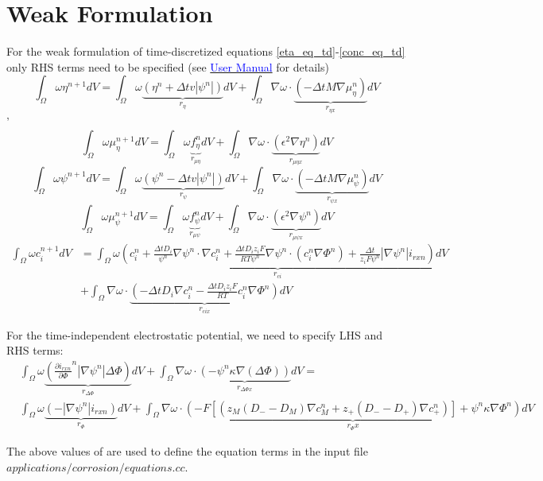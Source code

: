 \documentclass[10pt]{article}
\begin{document}
\section{Weak Formulation}
For the weak formulation of time-discretized equations \eqref{eta_eq_td}-\eqref{conc_eq_td} only RHS terms need to be specified (see \href{https://prisms-center.github.io/phaseField/doxygen_files/app_files.html}{\textcolor{blue}{User Manual}} for details)
\begin{equation}
\int_{\Omega} \omega \eta^{n+1} dV = \int_{\Omega} \omega \underbrace{\left( \eta^n +\Delta t v  |\psi^n|\right)}_{r_\eta}dV + \int_{\Omega} \nabla \omega \cdot  \underbrace{\left(-  \Delta t M \nabla \mu_\eta^n \right)}_{r_{\eta x}}dV
\end{equation}'
\begin{equation}
\int_{\Omega} \omega \mu_\eta^{n+1} dV = \int_{\Omega} \omega \underbrace{f_\eta^n}_{r_{\mu \eta}}dV + \int_{\Omega} \nabla \omega \cdot  \underbrace{(\epsilon^2\nabla\eta^n)}_{r_{\mu \eta x}}dV
\end{equation}
\begin{equation}
\int_{\Omega} \omega \psi^{n+1} dV = \int_{\Omega} \omega \underbrace{\left( \psi^n -\Delta t v  |\psi^n|\right)}_{r_\psi} dV+ \int_{\Omega} \nabla \omega \cdot  \underbrace{\left(-  \Delta t M \nabla \mu_\psi^n \right)}_{r_{\psi x}}dV
\end{equation}
\begin{equation}
\int_{\Omega} \omega \mu_\psi^{n+1} dV = \int_{\Omega} \omega \underbrace{f_\psi^n}_{r_{\mu \psi}}dV + \int_{\Omega} \nabla \omega \cdot  \underbrace{(\epsilon^2\nabla\psi^n)}_{r_{\mu \psi x}}dV
\end{equation}
\begin{align}
\int_{\Omega} \omega c_i^{n+1} dV &=\int_{\Omega} \omega \underbrace{\left( c_i^n+\frac{\Delta t D_i}{\psi^n}\nabla\psi^n\cdot\nabla c_i^n 
+\frac{\Delta t D_i z_i F}{RT\psi^n}\nabla\psi^n\cdot(c_i^n\nabla \Phi^n) +\frac{\Delta t}{z_i F\psi^n} |\nabla\psi^n| i_{rxn}\right)}_{r_{ci}} dV\\ 
&+ \int_{\Omega} \nabla \omega \cdot  \underbrace{\left( -\Delta t D_i \nabla c_i^n -\frac{\Delta t D_i z_i F}{RT} c_i^n\nabla \Phi^n \right)}_{r_{cix}}dV
\end{align}

For the time-independent electrostatic potential, we need to specify LHS and RHS terms:
\begin{align}
&\int_{\Omega} \omega  \underbrace{\left( \frac{\partial i_{rxn}}{\partial \Phi}^n |\nabla\psi^n| \Delta\Phi\right)}_{r_{\Delta \Phi}} dV 
+ \int_{\Omega} \nabla\omega \cdot  \underbrace{\left( -\psi^n \kappa  \nabla(\Delta\Phi)\right)}_{r_{\Delta \Phi x}} dV =\\
&\int_{\Omega} \omega  \underbrace{\left( -|\nabla\psi^n| i_{rxn} \right)}_{r_\Phi} dV + \int_{\Omega} \nabla\omega \cdot  \underbrace{\left( -F  \left[ \left( z_M (D_- - D_M) \nabla c_M^n + z_+ (D_- - D_+)  \nabla c_+^n \right) \right] +\psi^n \kappa \nabla\Phi^n \right)}_{r_\Phi x} dV
\end{align}

The above values of are used to define the equation terms in the input file $applications/corrosion/equations.cc$.
\end{document}
